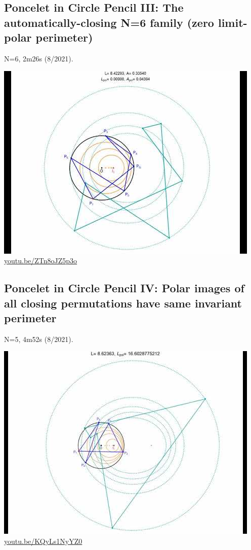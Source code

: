 \documentclass[12pt]{amsart}
\begin{document}
\subsection{Poncelet in Circle Pencil III: The automatically-closing N=6 family (zero limit-polar perimeter)}
\label{vid:ZTn8oJZ5p3o}
\noindent N=6, 2m26s (8/2021). 
\begin{center}\includegraphics[width=.5\textwidth]{pics/ZTn8oJZ5p3o.jpg} \\ 
\href{https://youtu.be/ZTn8oJZ5p3o}{\url{youtu.be/ZTn8oJZ5p3o}}\end{center}
% 

\subsection{Poncelet in Circle Pencil IV: Polar images of all closing permutations have same invariant perimeter}
\label{vid:KQyLs1NyYZ0}
\noindent N=5, 4m52s (8/2021). 
\begin{center}\includegraphics[width=.5\textwidth]{pics/KQyLs1NyYZ0.jpg} \\ 
\href{https://youtu.be/KQyLs1NyYZ0}{\url{youtu.be/KQyLs1NyYZ0}}\end{center}
% 
\end{document}
